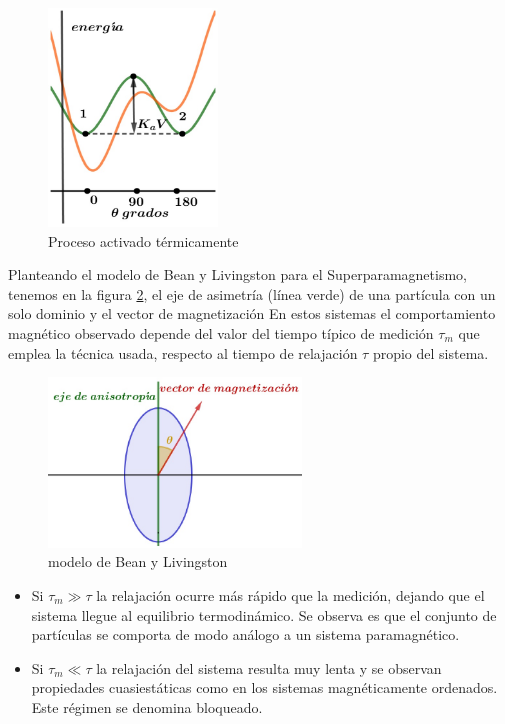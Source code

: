 \begin{figure}[H]
    \centering
    \includegraphics[width=0.4\textwidth]{./Figures/fig36}
	\caption{Proceso activado térmicamente}
	\label{fig:36}    
\end{figure}


Planteando el modelo de Bean y Livingston para el Superparamagnetismo, tenemos en la figura \ref{fig:37}, el eje de asimetría (línea verde) de una partícula con un solo dominio y el vector de magnetización En estos sistemas el comportamiento magnético observado depende del valor del tiempo típico de medición $\tau_{m}$ que emplea la técnica usada, respecto al tiempo de relajación $\tau$ propio del sistema.

\begin{figure}[H]
    \centering
    \includegraphics[width=0.6\textwidth]{./Figures/fig37}
	\caption{modelo de Bean y Livingston}
	\label{fig:37}    
\end{figure}


\begin{itemize}
	\item Si $\tau_{m}\gg \tau$ la relajación ocurre más rápido que la medición, dejando que el sistema llegue al equilibrio termodinámico. Se observa es que el conjunto de partículas se comporta de modo análogo a un sistema paramagnético.

	\item Si $\tau_{m}\ll \tau$ la relajación del sistema resulta muy lenta y se observan propiedades cuasiestáticas como
en los sistemas magnéticamente ordenados. Este régimen se denomina bloqueado.
\end{itemize}



